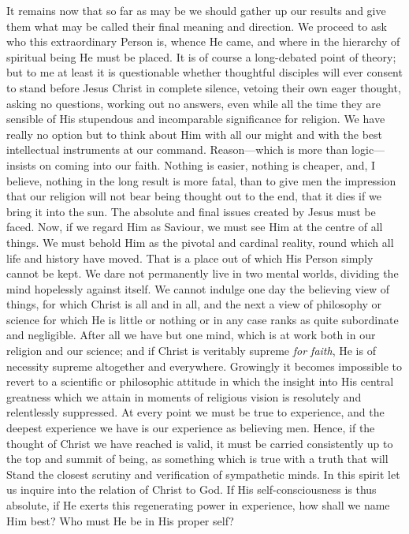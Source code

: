 \documentclass[12pt,a5paper,oneside]{book}
\begin{document}
It remains now that so far as may be we should
gather up our results and give them what
may be called their final meaning and direction.
We proceed to ask who this extraordinary
Person is, whence He came, and where in the
hierarchy of spiritual being He must be placed.
It is of course a long-debated point of theory;
but to me at least it is questionable whether
thoughtful disciples will ever consent to stand
before Jesus Christ in complete silence, vetoing
their own eager thought, asking no questions,
working out no answers, even while all the
time they are sensible of His stupendous and
incomparable significance for religion. We have
really no option but to think about Him with
all our might and with the best intellectual
instruments at our command. Reason---which
is more than logic---insists on coming into our
faith. Nothing is easier, nothing is cheaper,
and, I believe, nothing in the long result is
more fatal, than to give men the impression
that our religion will not bear being thought
out to the end, that it dies if we bring it into
the sun. The absolute and final issues created
by Jesus must be faced. Now, if we regard Him
as Saviour, we must see Him at the centre of
all things. We must behold Him as the pivotal
and cardinal reality, round which all life and
history have moved. That is a place out of
which His Person simply cannot be kept. We
dare not permanently live in two mental worlds,
dividing the mind hopelessly against itself.
We cannot indulge one day the believing
view of things, for which Christ is all and
in all, and the next a view of philosophy or
science for which He is little or nothing or
in any case ranks as quite subordinate and
negligible. After all we have but one mind,
which is at work both in our religion and
our science; and if Christ is veritably supreme
\textit{for faith}, He is of necessity supreme altogether 
and everywhere. Growingly it becomes
impossible to revert to a scientific or philosophic 
attitude in which the insight into His
central greatness which we attain in moments
of religious vision is resolutely and relentlessly
suppressed. At every point we must be true
to experience, and the deepest experience we
have is our experience as believing men. Hence,
if the thought of Christ we have reached is
valid, it must be carried consistently up to the
top and summit of being, as something which
is true with a truth that will Stand the closest
scrutiny and verification of sympathetic minds.
In this spirit let us inquire into the relation
of Christ to God. If His self-consciousness is
thus absolute, if He exerts this regenerating
power in experience, how shall we name Him
best? Who must He be in His proper self?
\end{document}
